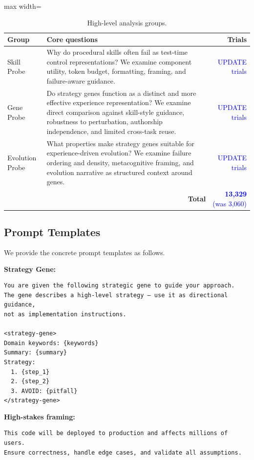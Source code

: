 \documentclass{article}
\newcommand{\blue}[1]{\textcolor{blue}{#1}}
\newcommand{\nbf}[1]{{\noindent \textbf{#1}}}
\begin{document}
\begin{table}[h]
\centering
\caption{High-level analysis groups.}
\label{tab:exp_matrix}
\begin{adjustbox}{max width=\textwidth}
\begin{tabular}{p{3.0cm} p{10.2cm} r}
\toprule
\textbf{Group} & \textbf{Core questions} & \textbf{Trials} \\
\midrule
Skill Probe
& Why do procedural skills often fail as test-time control representations? We examine component utility, token budget, formatting, framing, and failure-aware guidance.
& \blue{UPDATE trials} \\

Gene Probe
& Do strategy genes function as a distinct and more effective experience representation? We examine direct comparison against skill-style guidance, robustness to perturbation, authorship independence, and limited cross-task reuse.
& \blue{UPDATE trials} \\

Evolution Probe
& What properties make strategy genes suitable for experience-driven evolution? We examine failure ordering and density, metacognitive framing, and evolution narrative as structured context around genes.
& \blue{UPDATE trials} \\
\midrule
\multicolumn{2}{r}{\textbf{Total}} & \blue{\textbf{13,329} (was 3,060)} \\
\bottomrule
\end{tabular}
\end{adjustbox}
\end{table}

\subsection{Prompt Templates}
\label{app:prompt_templates}

We provide the concrete prompt templates as follows. 

\nbf{Strategy Gene:}
\begin{verbatim}
You are given the following strategic gene to guide your approach.
The gene describes a high-level strategy — use it as directional guidance,
not as implementation instructions.

<strategy-gene>
Domain keywords: {keywords}
Summary: {summary}
Strategy:
  1. {step_1}
  2. {step_2}
  3. AVOID: {pitfall}
</strategy-gene>
\end{verbatim}

\nbf{High-stakes framing:}
\begin{verbatim}
This code will be deployed to production and affects millions of users.
Ensure correctness, handle edge cases, and validate all assumptions.
\end{verbatim}
\end{document}
